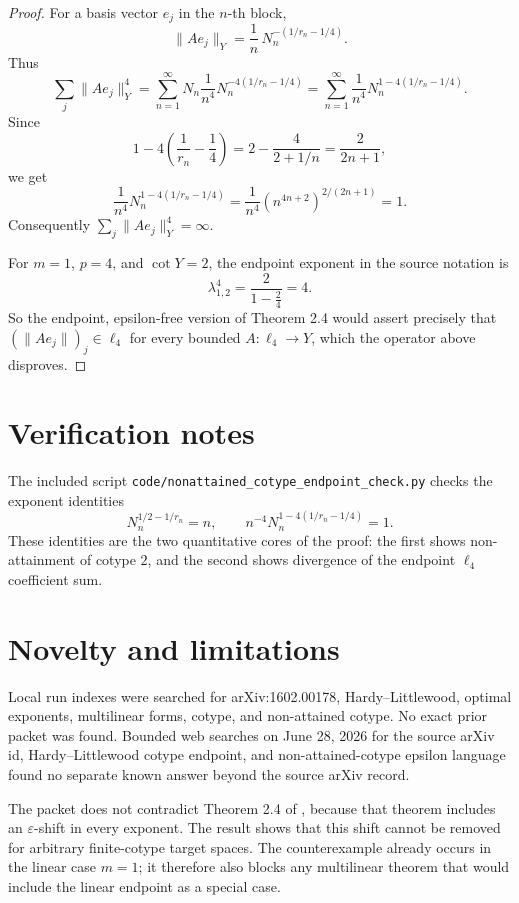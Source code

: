 \documentclass[11pt]{article}
\begin{document}
\begin{proof}
For a basis vector \(e_j\) in the \(n\)-th block,
\[
\|Ae_j\|_Y
=
\frac1n\,N_n^{-(1/r_n-1/4)}.
\]
Thus
\[
\sum_j \|Ae_j\|_Y^4
=
\sum_{n=1}^{\infty}
N_n\frac1{n^4}N_n^{-4(1/r_n-1/4)}
=
\sum_{n=1}^{\infty}
\frac1{n^4}N_n^{1-4(1/r_n-1/4)}.
\]
Since
\[
1-4\left(\frac1{r_n}-\frac14\right)
=2-\frac4{2+1/n}
=\frac{2}{2n+1},
\]
we get
\[
\frac1{n^4}N_n^{1-4(1/r_n-1/4)}
=
\frac1{n^4}\left(n^{4n+2}\right)^{2/(2n+1)}
=1.
\]
Consequently \(\sum_j\|Ae_j\|_Y^4=\infty\).

For \(m=1\), \(p=4\), and \(\cot Y=2\), the endpoint exponent in the source
notation is
\[
\lambda_{1,2}^4=\frac{2}{1-\frac{2}{4}}=4.
\]
So the endpoint, epsilon-free version of Theorem 2.4 would assert precisely
that \((\|Ae_j\|)_j\in\ell_4\) for every bounded \(A:\ell_4\to Y\), which the
operator above disproves.
\end{proof}

\section{Verification notes}

The included script \texttt{code/nonattained\_cotype\_endpoint\_check.py}
checks the exponent identities
\[
N_n^{1/2-1/r_n}=n,\qquad
n^{-4}N_n^{1-4(1/r_n-1/4)}=1.
\]
These identities are the two quantitative cores of the proof: the first shows
non-attainment of cotype \(2\), and the second shows divergence of the endpoint
\(\ell_4\) coefficient sum.

\section{Novelty and limitations}

Local run indexes were searched for arXiv:1602.00178, Hardy--Littlewood,
optimal exponents, multilinear forms, cotype, and non-attained cotype.  No
exact prior packet was found.  Bounded web searches on June 28, 2026 for the
source arXiv id, Hardy--Littlewood cotype endpoint, and non-attained-cotype
epsilon language found no separate known answer beyond the source arXiv
record.

The packet does not contradict Theorem 2.4 of \cite{aron1602}, because that
theorem includes an \(\varepsilon\)-shift in every exponent.  The result shows
that this shift cannot be removed for arbitrary finite-cotype target spaces.
The counterexample already occurs in the linear case \(m=1\); it therefore
also blocks any multilinear theorem that would include the linear endpoint as
a special case.
\end{document}
